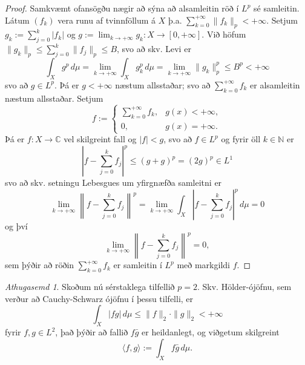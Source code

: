 \documentclass[a4paper,icelandic,11pt]{book}
\theoremstyle{plain}      \newtheorem{setn}{Setning}[chapter]
\theoremstyle{definition} \newtheorem{skilgr}[setn]{Skilgreining}
\theoremstyle{remark}     \newtheorem*{ath}{Athugasemd}
\newcommand{\C}{\mathbb C}
\newcommand{\N}{\mathbb N}
\begin{document}
\begin{proof}
  Samkvæmt ofansögðu nægir að sýna að alsamleitin röð í $L^{p}$ sé
  samleitin. Látum $(f_{k})$ vera runu af tvinnföllum á $X$
  þ.a. $\sum_{k=0}^{+\infty}\|f_{k}\|_{p} < +\infty$. Setjum
  $g_{k}:=\sum_{j=0}^{k}|f_{k}|$ og
  $g:=\lim_{k\to+\infty}g_{k}:X\to[0,+\infty]$. Við höfum
  $\|g_{k}\|_{p}\le\sum_{j=0}^{k}\|f_{j}\|_{p}\le B$, svo að skv. Levi
  er
  \[
  \int_{X}g^{p}\,d\mu
  = \lim_{k\to+\infty}\int_{X}g_{k}^{p}\,d\mu
  = \lim_{k\to+\infty}\| g_{k} \|_{p}^{p}
  \le B^{p}
  < +\infty
  \]
  svo að $g\in L^{p}$. Þá er $g<+\infty$ næstum allsstaðar; svo að
  $\sum_{k=0}^{+\infty}f_{k}$ er alsamleitin næstum allsstaðar. Setjum
  \[
  f :=
  \begin{cases}
    \sum_{k=0}^{+\infty} f_{k}, & g(x) < +\infty, \\
    0, &  g(x) = +\infty.
  \end{cases}
  \]
  Þá er $f:X\to\C$ vel skilgreint fall og $|f|<g$, svo að $f\in L^{p}$
  og fyrir öll $k\in\N$ er
  \[
  \left|
    f - \sum_{j=0}^{k} f_{j}
  \right|^{p}
  \le (g + g)^{p}
  = (2g)^{p}
  \in L^{1}
  \]
  svo að skv. setningu Lebesgues um yfirgnæfða samleitni er
  \[
  \lim_{k\to+\infty} \left\|
    f - \sum_{j=0}^{k} f_{j}
  \right\|^{p}
  = \lim_{k\to+\infty} \int_{X}
  \left|
    f - \sum_{j=0}^{k} f_{j}
  \right|^{p}\,d\mu
  = 0
  \]
  og því
  \[
  \lim_{k\to+\infty}\left\|
    f - \sum_{j=0}^{k} f_{j}
  \right\|^{p}
  = 0,
  \]
  sem þýðir að röðin $\sum_{k=0}^{+\infty}f_{k}$ er samleitin í
  $L^{p}$ með markgildi $f$.
\end{proof}
\begin{ath}
  Skoðum nú sérstaklega tilfellið $p=2$. Skv. Hölder-ójöfnu, sem
  verður að Cauchy-Schwarz ójöfnu í þessu tilfelli, er
  \[
  \int_{X}|fg|\,d\mu
  \le \|f\|_{2}\cdot\|g\|_{2}
  < +\infty
  \]
  fyrir $f,g\in L^{2}$, það þýðir að fallið $f\bar g$ er heildanlegt,
  og viðgetum skilgreint
  \[
  \langle f,g\rangle
  := \int_{X}f\bar g\,d\mu.
  \]
\end{ath}
\end{document}

